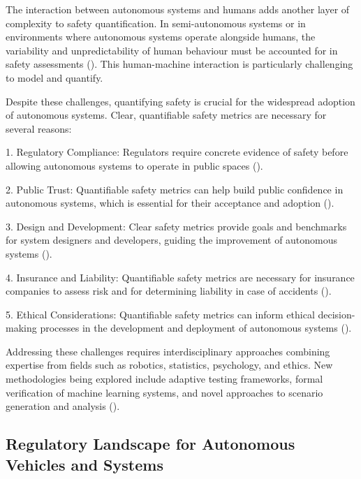 The interaction between autonomous systems and humans adds another layer of complexity to safety quantification. In semi-autonomous systems or in environments where autonomous systems operate alongside humans, the variability and unpredictability of human behaviour must be accounted for in safety assessments (\cite{Endsley2017}). This human-machine interaction is particularly challenging to model and quantify.

Despite these challenges, quantifying safety is crucial for the widespread adoption of autonomous systems. Clear, quantifiable safety metrics are necessary for several reasons:

1. Regulatory Compliance: Regulators require concrete evidence of safety before allowing autonomous systems to operate in public spaces (\cite{Cummings2021}).

2. Public Trust: Quantifiable safety metrics can help build public confidence in autonomous systems, which is essential for their acceptance and adoption (\cite{Choi2020}).

3. Design and Development: Clear safety metrics provide goals and benchmarks for system designers and developers, guiding the improvement of autonomous systems (\cite{Shalev2017}).

4. Insurance and Liability: Quantifiable safety metrics are necessary for insurance companies to assess risk and for determining liability in case of accidents (\cite{Schellekens2015}).

5. Ethical Considerations: Quantifiable safety metrics can inform ethical decision-making processes in the development and deployment of autonomous systems (\cite{Awad2018}).

Addressing these challenges requires interdisciplinary approaches combining expertise from fields such as robotics, statistics, psychology, and ethics. New methodologies being explored include adaptive testing frameworks, formal verification of machine learning systems, and novel approaches to scenario generation and analysis (\cite{Seshia2016}).


\subsection{Regulatory Landscape for Autonomous Vehicles and Systems}

